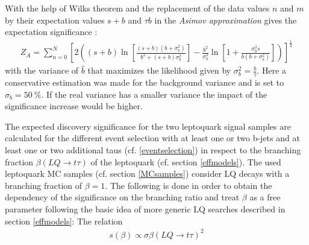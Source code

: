 %
With the help of Wilks theorem \cite{Wilks} and the replacement of the data values $n$ and $m$ by their expectation values $s+b$ and $\tau b$ in the \textit{Asimov approximation} gives the expectation significance \cite{AsimovSignificance}:
\begin{align}
           Z_A=\sum_{n=0}^{N}\left[2\left((s+b)\ln\left[\frac{(s+b)(b+\sigma_b^2)}{b^2+(s+b)\sigma_b^2}\right]-\frac{b^2}{\sigma_b^2}\ln\left[1+\frac{\sigma_b^2s}{b(b+\sigma_b^2)}\right]\right)\right]^\frac{1}{2}
\label{ZA}
\end{align}
with the variance of $\hat{b}$ that maximizes the likelihood given by $\sigma_b^2=\frac{b}{\tau}$. Here a conservative estimation was made for the background variance and is set to $\sigma_b=\SI{50}{\percent}$. If the real variance has a smaller variance the impact of the significance increase would be higher.\par
The expected discovery significance for the two leptoquark signal samples are calculated for the different event selection with at least one or two b-jets and at least one or two additional taus (cf. \ref{eventselection}) in respect to the branching fraction $\beta(LQ\rightarrow t\tau)$ of the leptoquark (cf. section \ref{effmodels}). The used leptoquark MC samples (cf. section \ref{MCsamples}) consider LQ decays with a branching fraction of $\beta=1$. The following is done in order to obtain the dependency of the significance on the branching ratio and treat $\beta$ as a free parameter following the basic idea of more generic LQ searches described in section \ref{effmodels}:
The relation
\begin{align}
                s(\beta)\propto\sigma\beta(LQ\rightarrow t\tau)^2
\label{sbeta}
\end{align}
%
